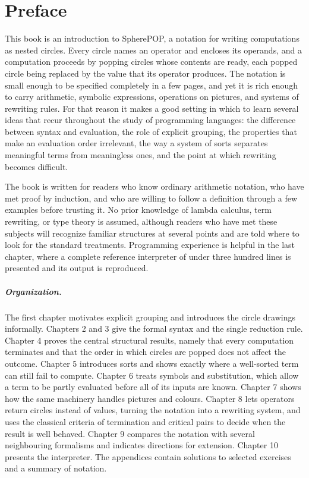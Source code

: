 \chapter*{Preface}

This book is an introduction to SpherePOP, a notation for writing computations as nested circles. Every circle names an operator and encloses its operands, and a computation proceeds by popping circles whose contents are ready, each popped circle being replaced by the value that its operator produces. The notation is small enough to be specified completely in a few pages, and yet it is rich enough to carry arithmetic, symbolic expressions, operations on pictures, and systems of rewriting rules. For that reason it makes a good setting in which to learn several ideas that recur throughout the study of programming languages: the difference between syntax and evaluation, the role of explicit grouping, the properties that make an evaluation order irrelevant, the way a system of sorts separates meaningful terms from meaningless ones, and the point at which rewriting becomes difficult.

The book is written for readers who know ordinary arithmetic notation, who have met proof by induction, and who are willing to follow a definition through a few examples before trusting it. No prior knowledge of lambda calculus, term rewriting, or type theory is assumed, although readers who have met these subjects will recognize familiar structures at several points and are told where to look for the standard treatments. Programming experience is helpful in the last chapter, where a complete reference interpreter of under three hundred lines is presented and its output is reproduced.

\paragraph{Organization.}
The first chapter motivates explicit grouping and introduces the circle drawings informally. Chapters 2 and 3 give the formal syntax and the single reduction rule. Chapter 4 proves the central structural results, namely that every computation terminates and that the order in which circles are popped does not affect the outcome. Chapter 5 introduces sorts and shows exactly where a well-sorted term can still fail to compute. Chapter 6 treats symbols and substitution, which allow a term to be partly evaluated before all of its inputs are known. Chapter 7 shows how the same machinery handles pictures and colours. Chapter 8 lets operators return circles instead of values, turning the notation into a rewriting system, and uses the classical criteria of termination and critical pairs to decide when the result is well behaved. Chapter 9 compares the notation with several neighbouring formalisms and indicates directions for extension. Chapter 10 presents the interpreter. The appendices contain solutions to selected exercises and a summary of notation.


